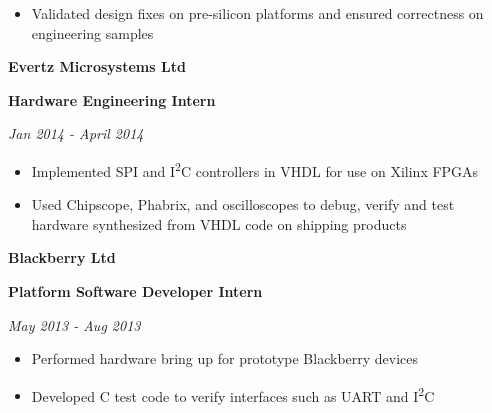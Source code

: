 \documentclass{article}
\newenvironment{name}{\fontfamily{phv}\selectfont\bfseries\normalsize}{\par}
\newenvironment{colorheading}{\fontfamily{phv}\selectfont\bfseries\normalsize\color{darkcyan}}{\par}
\newenvironment{metadata}{\fontfamily{phv}\selectfont\itshape\small\color{darkgray}}{\par}
\newenvironment{itemizedbody}{\fontfamily{phv}\selectfont\small\raggedright\begin{itemize}}{\end{itemize}\par}
\newenvironment{experience}[2]%
{%
  \begin{minipage}{0.71\linewidth}\raggedright#1\end{minipage}%
  \hfill%
  \begin{minipage}{0.28\linewidth}\raggedleft#2\end{minipage}%
}%
{\par}
\newcommand{\lineitem}{\item[{$\star$}]}
\begin{document}
\begin{minipage}[t]{0.67\linewidth}
\begin{itemizedbody}
      \lineitem Validated design fixes on pre-silicon platforms and ensured correctness on engineering samples
    \end{itemizedbody}
    \smallskip
    \begin{experience}
    {
      \begin{name}Evertz Microsystems Ltd\end{name}
      \begin{colorheading}Hardware Engineering Intern\end{colorheading}
    }
    {
      \begin{metadata}Jan 2014 - April 2014\end{metadata}
    }
    \end{experience}
    \begin{itemizedbody}
      \lineitem Implemented SPI and I\textsuperscript{2}C controllers in VHDL for use on Xilinx FPGAs
      \lineitem Used Chipscope, Phabrix, and oscilloscopes to debug, verify and test hardware synthesized from VHDL code on
                shipping products
    \end{itemizedbody}
    \smallskip
    \begin{experience}
    {
      \begin{name}Blackberry Ltd\end{name}
      \begin{colorheading}Platform Software Developer Intern\end{colorheading}
    }
    {
      \begin{metadata}May 2013 - Aug 2013\end{metadata}
    }
    \end{experience}
    \begin{itemizedbody}
      \lineitem Performed hardware bring up for prototype Blackberry devices
      \lineitem Developed C test code to verify interfaces such as UART and I\textsuperscript{2}C
    \end{itemizedbody}

\end{minipage}
\end{document}
